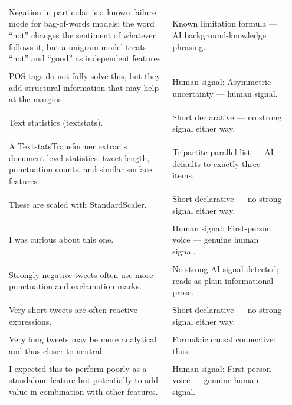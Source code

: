 \documentclass[11pt]{article}
\begin{document}
\begin{longtable}{|p{0.55\linewidth}|p{0.40\linewidth}|}
\hline
\rule{0pt}{3.5cm} & \\
\hline
Negation in particular is a known failure mode for bag-of-words models: the word ``not'' changes the sentiment of whatever follows it, but a unigram model treats ``not'' and ``good'' as independent features. & Known limitation formula --- AI background-knowledge phrasing. \\[2pt]
\hline
\rule{0pt}{3.5cm} & \\
\hline
POS tags do not fully solve this, but they add structural information that may help at the margins. & Human signal: Asymmetric uncertainty --- human signal. \\[2pt]
\hline
\rule{0pt}{3.5cm} & \\
\hline
Text statistics (textstats). & Short declarative --- no strong signal either way. \\[2pt]
\hline
\rule{0pt}{3.5cm} & \\
\hline
A TextstatsTransformer extracts document-level statistics: tweet length, punctuation counts, and similar surface features. & Tripartite parallel list --- AI defaults to exactly three items. \\[2pt]
\hline
\rule{0pt}{3.5cm} & \\
\hline
These are scaled with StandardScaler. & Short declarative --- no strong signal either way. \\[2pt]
\hline
\rule{0pt}{3.5cm} & \\
\hline
I was curious about this one. & Human signal: First-person voice --- genuine human signal. \\[2pt]
\hline
\rule{0pt}{3.5cm} & \\
\hline
Strongly negative tweets often use more punctuation and exclamation marks. & No strong AI signal detected; reads as plain informational prose. \\[2pt]
\hline
\rule{0pt}{3.5cm} & \\
\hline
Very short tweets are often reactive expressions. & Short declarative --- no strong signal either way. \\[2pt]
\hline
\rule{0pt}{3.5cm} & \\
\hline
Very long tweets may be more analytical and thus closer to neutral. & Formulaic causal connective: thus. \\[2pt]
\hline
\rule{0pt}{3.5cm} & \\
\hline
I expected this to perform poorly as a standalone feature but potentially to add value in combination with other features. & Human signal: First-person voice --- genuine human signal. \\[2pt]

\end{longtable}
\end{document}
